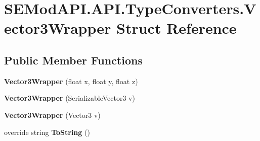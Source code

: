 \hypertarget{struct_s_e_mod_a_p_i_1_1_a_p_i_1_1_type_converters_1_1_vector3_wrapper}{}\section{S\+E\+Mod\+A\+P\+I.\+A\+P\+I.\+Type\+Converters.\+Vector3\+Wrapper Struct Reference}
\label{struct_s_e_mod_a_p_i_1_1_a_p_i_1_1_type_converters_1_1_vector3_wrapper}
\subsection*{Public Member Functions}
\begin{DoxyCompactItemize}
\item 
\hypertarget{struct_s_e_mod_a_p_i_1_1_a_p_i_1_1_type_converters_1_1_vector3_wrapper_af5e3db86381a38fde7a8494139200b65}{}{\bfseries Vector3\+Wrapper} (float x, float y, float z)\label{struct_s_e_mod_a_p_i_1_1_a_p_i_1_1_type_converters_1_1_vector3_wrapper_af5e3db86381a38fde7a8494139200b65}

\item 
\hypertarget{struct_s_e_mod_a_p_i_1_1_a_p_i_1_1_type_converters_1_1_vector3_wrapper_aebed7b65b005d71e72e431c52b7783b2}{}{\bfseries Vector3\+Wrapper} (Serializable\+Vector3 v)\label{struct_s_e_mod_a_p_i_1_1_a_p_i_1_1_type_converters_1_1_vector3_wrapper_aebed7b65b005d71e72e431c52b7783b2}

\item 
\hypertarget{struct_s_e_mod_a_p_i_1_1_a_p_i_1_1_type_converters_1_1_vector3_wrapper_a1cdbfdd69fefc118a4bed5e6cdc99653}{}{\bfseries Vector3\+Wrapper} (Vector3 v)\label{struct_s_e_mod_a_p_i_1_1_a_p_i_1_1_type_converters_1_1_vector3_wrapper_a1cdbfdd69fefc118a4bed5e6cdc99653}

\item 
\hypertarget{struct_s_e_mod_a_p_i_1_1_a_p_i_1_1_type_converters_1_1_vector3_wrapper_a0f53ba6737fa427d987944c31757a31a}{}override string {\bfseries To\+String} ()\label{struct_s_e_mod_a_p_i_1_1_a_p_i_1_1_type_converters_1_1_vector3_wrapper_a0f53ba6737fa427d987944c31757a31a}

\end{DoxyCompactItemize}
